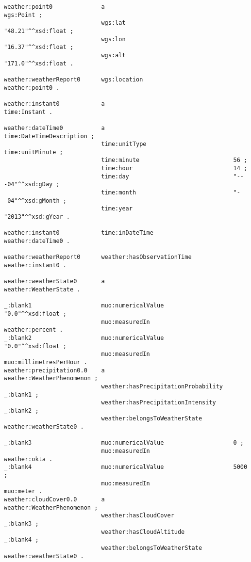 \begin{lstlisting}
weather:point0              a                                     wgs:Point ;
                            wgs:lat                               "48.21"^^xsd:float ;
                            wgs:lon                               "16.37"^^xsd:float ;
                            wgs:alt                               "171.0"^^xsd:float .

weather:weatherReport0      wgs:location                          weather:point0 .

weather:instant0            a                                     time:Instant .

weather:dateTime0           a                                     time:DateTimeDescription ;
                            time:unitType                         time:unitMinute ;
                            time:minute                           56 ;
                            time:hour                             14 ;
                            time:day                              "---04"^^xsd:gDay ;
                            time:month                            "--04"^^xsd:gMonth ;
                            time:year                             "2013"^^xsd:gYear .

weather:instant0            time:inDateTime                       weather:dateTime0 .

weather:weatherReport0      weather:hasObservationTime            weather:instant0 .

weather:weatherState0       a                                     weather:WeatherState .

_:blank1                    muo:numericalValue                    "0.0"^^xsd:float ;
                            muo:measuredIn                        weather:percent .
_:blank2                    muo:numericalValue                    "0.0"^^xsd:float ;
                            muo:measuredIn                        muo:millimetresPerHour .
weather:precipitation0.0    a                                     weather:WeatherPhenomenon ;
                            weather:hasPrecipitationProbability   _:blank1 ;
                            weather:hasPrecipitationIntensity     _:blank2 ;
                            weather:belongsToWeatherState         weather:weatherState0 .

_:blank3                    muo:numericalValue                    0 ;
                            muo:measuredIn                        weather:okta .
_:blank4                    muo:numericalValue                    5000 ;
                            muo:measuredIn                        muo:meter .
weather:cloudCover0.0       a                                     weather:WeatherPhenomenon ;
                            weather:hasCloudCover                 _:blank3 ;
                            weather:hasCloudAltitude              _:blank4 ;
                            weather:belongsToWeatherState         weather:weatherState0 .


\end{lstlisting}
